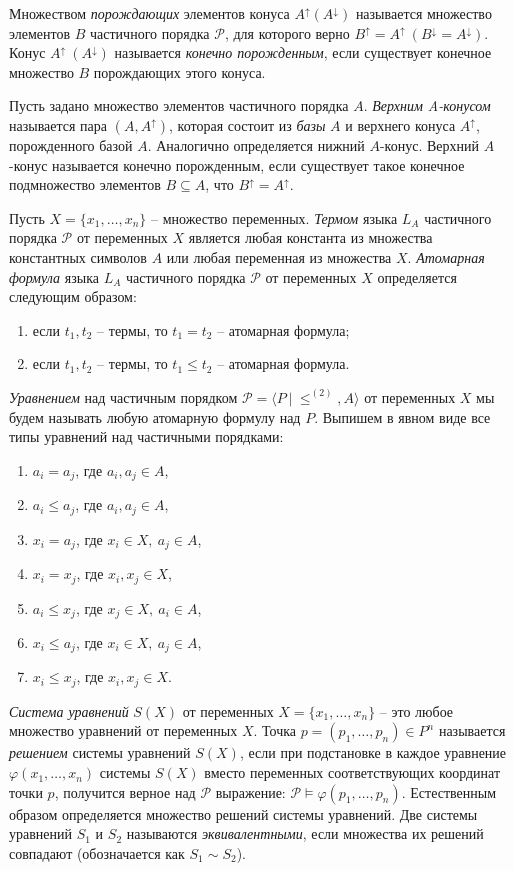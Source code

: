 \documentclass[12pt]{article}
\theoremstyle{break}
\def\P{\mathcal{P}}
\begin{document}
		Множеством \textit{порождающих} элементов конуса $A^{\uparrow}(A^{\downarrow})$ называется множество элементов $B$ частичного порядка $\P$, для которого верно $B^{\uparrow}=A^{\uparrow}~(B^{\downarrow}=A^{\downarrow})$. Конус $A^{\uparrow}~(A^{\downarrow})$ называется \textit{конечно порожденным}, если существует конечное множество $B$ порождающих этого конуса.

		Пусть задано множество элементов частичного порядка $A$. \textit{Верхним A-конусом} называется пара $(A, A^{\uparrow})$, которая состоит из \textit{базы} $A$ и верхнего конуса $A^{\uparrow}$, порожденного базой $A$. Аналогично определяется нижний $A$-конус. Верхний $A$-конус называется конечно порожденным, если существует такое конечное подмножество элементов $B\subseteq A$, что $B^{\uparrow} = A^{\uparrow}$.

		Пусть $X = \{x_1,\dots,x_n\}$ -- множество переменных. \textit{Термом} языка $L_A$ частичного порядка $\P$ от переменных $X$ является любая константа из множества константных символов $A$ или любая переменная из множества $X$. \textit{Атомарная формула} языка $L_A$ частичного порядка $\P$ от переменных $X$ определяется следующим образом:
		\begin{enumerate}
			\item если $t_1, t_2$ -- термы, то $t_1=t_2$ -- атомарная формула;
			\item если $t_1, t_2$ -- термы, то $t_1\leqslant t_2$ -- атомарная формула.
		\end{enumerate}

		\textit{Уравнением} над частичным порядком $\P = \langle P~|~\leqslant^{(2)}, A\rangle$ от переменных $X$ мы будем называть любую атомарную формулу над $P$. Выпишем в явном виде все типы уравнений над частичными порядками:
		\begin{enumerate}
			\item $a_i=a_j$, где $a_i, a_j\in A$,
			\item $a_i\leqslant a_j$, где $a_i, a_j\in A$,
			\item $x_i=a_j$, где $x_i\in X,~a_j\in A$,
			\item $x_i=x_j$, где $x_i, x_j\in X$,
			\item $a_i\leqslant x_j$, где $x_j\in X,~a_i\in A$,
			\item $x_i\leqslant a_j$, где $x_i\in X,~a_j\in A$,
			\item $x_i\leqslant x_j$, где $x_i, x_j\in X$.
		\end{enumerate}

		\textit{Система уравнений} $S(X)$ от переменных $X=\{x_1,\dots,x_n\}$ -- это любое множество уравнений от переменных $X$. Точка $p=(p_1,\dots,p_n)\in P^n$ называется \textit{решением} системы уравнений $S(X)$, если при подстановке в каждое уравнение $\varphi(x_1,\dots,x_n)$ системы $S(X)$ вместо переменных соответствующих координат точки $p$, получится верное над $\P$ выражение: $\P\vDash \varphi(p_1,\dots,p_n)$. Естественным образом определяется множество решений системы уравнений. Две системы уравнений $S_1$ и $S_2$ называются \textit{эквивалентными}, если множества их решений совпадают (обозначается как $S_1\sim S_2$).
\end{document}
